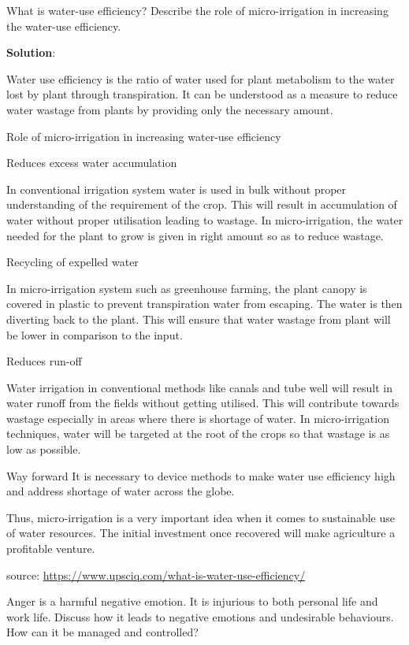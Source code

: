 \documentclass[
  openany]{book}
\newcommand{\question}{\item}
\newenvironment{solution}{ {\bfseries Solution}:}{}
\begin{document}
\begin{questions}
\question What is water-use efficiency? Describe the role of micro-irrigation in increasing the water-use efficiency.

\begin{solution}

Water use efficiency is the ratio of water used for plant metabolism to the water lost by plant through transpiration. It can be understood as a measure to reduce water wastage from plants by providing only the necessary amount.

Role of micro-irrigation in increasing water-use efficiency

Reduces excess water accumulation
    
In conventional irrigation system water is used in bulk without proper understanding of the requirement of the crop. This will result in accumulation of water without proper utilisation leading to wastage. In micro-irrigation, the water needed for the plant to grow is given in right amount so as to reduce wastage.

Recycling of expelled water

In micro-irrigation system such as greenhouse farming, the plant canopy is covered in plastic to prevent transpiration water from escaping. The water is then diverting back to the plant. This will ensure that water wastage from plant will be lower in comparison to the input.

Reduces run-off

Water irrigation in conventional methods like canals and tube well will result in water runoff from the fields without getting utilised. This will contribute towards wastage especially in areas where there is shortage of water. In micro-irrigation techniques, water will be targeted at the root of the crops so that wastage is as low as possible.

Way forward
It is necessary to device methods to make water use efficiency high and address shortage of water across the globe.

Thus, micro-irrigation is a very important idea when it comes to sustainable use of water resources. The initial investment once recovered will make agriculture a profitable venture.

source: \url{https://www.upsciq.com/what-is-water-use-efficiency/}
\end{solution}

\question Anger is a harmful negative emotion. It is injurious to both personal life and work life. Discuss how it leads to negative emotions and undesirable behaviours. How can it be managed and controlled?


\end{questions}
\end{document}
